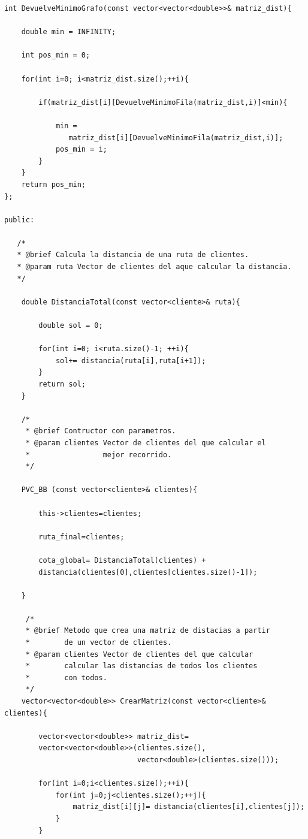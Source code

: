 \documentclass[a4paper,12pt,twoside]{article} %
\begin{document}
\begin{lstlisting}
int DevuelveMinimoGrafo(const vector<vector<double>>& matriz_dist){

    double min = INFINITY;

    int pos_min = 0;

    for(int i=0; i<matriz_dist.size();++i){

        if(matriz_dist[i][DevuelveMinimoFila(matriz_dist,i)]<min){

            min = 
               matriz_dist[i][DevuelveMinimoFila(matriz_dist,i)];
            pos_min = i;
        }
    }
    return pos_min;
};

public:

   /*
   * @brief Calcula la distancia de una ruta de clientes.
   * @param ruta Vector de clientes del aque calcular la distancia.
   */

    double DistanciaTotal(const vector<cliente>& ruta){

        double sol = 0;

        for(int i=0; i<ruta.size()-1; ++i){
            sol+= distancia(ruta[i],ruta[i+1]);
        }
        return sol;
    }

    /*
     * @brief Contructor con parametros.
     * @param clientes Vector de clientes del que calcular el 
     *                 mejor recorrido.
     */

    PVC_BB (const vector<cliente>& clientes){

        this->clientes=clientes;

        ruta_final=clientes;

        cota_global= DistanciaTotal(clientes) + 
        distancia(clientes[0],clientes[clientes.size()-1]);

    }

     /*
     * @brief Metodo que crea una matriz de distacias a partir 
     *        de un vector de clientes.
     * @param clientes Vector de clientes del que calcular 
     *        calcular las distancias de todos los clientes 
     *        con todos.
     */
    vector<vector<double>> CrearMatriz(const vector<cliente>& clientes){

        vector<vector<double>> matriz_dist= 
        vector<vector<double>>(clientes.size(),
                               vector<double>(clientes.size()));

        for(int i=0;i<clientes.size();++i){
            for(int j=0;j<clientes.size();++j){
                matriz_dist[i][j]= distancia(clientes[i],clientes[j]);
            }
        }


\end{lstlisting}
\end{document}
